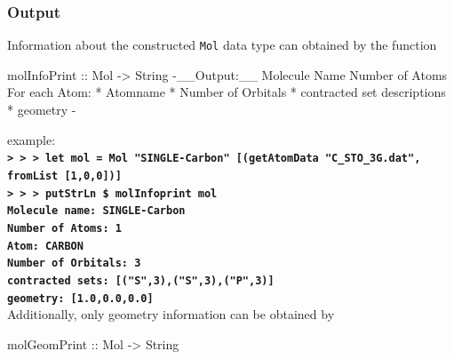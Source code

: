\documentclass[twoside,        %
			   11pt,			%
               BCOR10mm,       %
               ngerman,english  %
               ]{scrartcl}
\begin{document}
\subsubsection{Output}
Information about the constructed \texttt{Mol} data type can obtained by the function
\begin{code}
molInfoPrint :: Mol -> String
{-__Output:__ 
	Molecule Name
	Number of Atoms
	For each Atom:
		* Atomname
		* Number of Orbitals
		* contracted set descriptions
		* geometry
-}
\end{code}
example:\\
\textbf{\texttt{> > > let mol = Mol "SINGLE-Carbon" [(getAtomData "C\_STO\_3G.dat", fromList [1,0,0])]
}}\\
\textbf{\texttt{> > > putStrLn \$ molInfoprint mol
}} \\
\textbf{\texttt{Molecule name:   SINGLE-Carbon}}\\
\textbf{\texttt{Number of Atoms:  1}}\\
\quad \textbf{\texttt{Atom:    CARBON}}\\
\quad \textbf{\texttt{Number of Orbitals:	3}}\\
\quad \quad \textbf{\texttt{contracted sets:	[("S",3),("S",3),("P",3)]}}\\
\quad \quad \textbf{\texttt{geometry:	 	[1.0,0.0,0.0]}}\\
Additionally, only geometry information can be obtained by
\begin{code}
molGeomPrint :: Mol -> String
\end{code}
\end{document}
